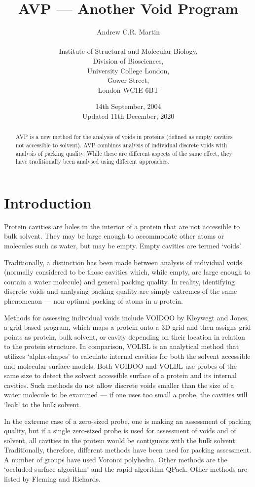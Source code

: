 \documentclass{article}
\title{AVP --- Another Void Program}
\author{Andrew C.R. Martin\\
\vspace*{1ex}\\
Institute of Structural and Molecular Biology,\\
Division of Biosciences,\\
University College London,\\
Gower Street,\\
London WC1E 6BT}
\date{14th September, 2004\\Updated 11th December, 2020}
\let\shortcite\cite
\begin{document}
\maketitle

\begin{abstract}
AVP is a new method for the analysis of voids in proteins (defined as
empty cavities not accessible to solvent). AVP combines analysis of
individual discrete voids with analysis of packing quality. While
these are different aspects of the same effect, they have
traditionally been analysed using different approaches.
\end{abstract}


\section{Introduction}
Protein cavities are holes in the interior of a protein that are not
accessible to bulk solvent. They may be large enough to accommodate
other atoms or molecules such as water, but may be empty. Empty
cavities are termed `voids'.

Traditionally, a distinction has been made between analysis of
individual voids (normally considered to be those cavities which,
while empty, are large enough to contain a water molecule) and general
packing quality.  In reality, identifying discrete voids and analysing
packing quality are simply extremes of the same phenomenon ---
non-optimal packing of atoms in a protein.

Methods for assessing individual voids include VOIDOO by Kleywegt and
Jones\shortcite{kleywegt:voidoo}, a grid-based program, which maps a
protein onto a 3D grid and then assigns grid points as protein, bulk
solvent, or cavity depending on their location in relation to the
protein structure. In comparison, VOLBL\cite{edelsbrunner:voids} is an
analytical method that utilizes `alpha-shapes' to calculate internal
cavities for both the solvent accessible and molecular surface
models. Both VOIDOO and VOLBL use probes of the same size to detect
the solvent accessible surface of a protein and its internal cavities.
Such methods do not allow discrete voids smaller than the size of a
water molecule to be examined --- if one uses too small a probe, the
cavities will `leak' to the bulk solvent.

In the extreme case of a zero-sized probe, one is making an assessment
of packing quality, but if a single zero-sized probe is used for
assessment of voids and of solvent, all cavities in the protein would
be contiguous with the bulk solvent. Traditionally, therefore,
different methods have been used for packing assessment.  A number of
groups have used Voronoi
polyhedra\cite{lesk:folding,ptitsyn:evolution,gerstein:volume,tsai:packing,richards:packing}.
Other methods are the `occluded surface
algorithm'\cite{pattabiraman:occluded} and the rapid algorithm
QPack\cite{gregoret:qpack}.  Other methods are listed by Fleming and
Richards\shortcite{fleming:packing}.
\end{document}
